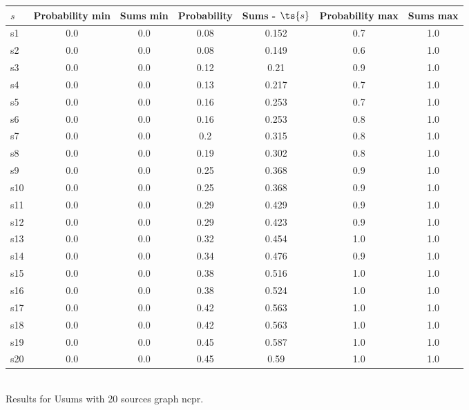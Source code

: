 \documentclass{article}
\begin{document}
\noindent\begin{tabular}{|l|c|c|c|c|c|c|}
\hline
$s$& Probability min & Sums min & Probability & Sums - $\ts{s}$ & Probability max & Sums max\\
\hline
s1 &0.0 & 0.0 & 0.08 & 0.152 & 0.7 & 1.0\\
\hline
s2 &0.0 & 0.0 & 0.08 & 0.149 & 0.6 & 1.0\\
\hline
s3 &0.0 & 0.0 & 0.12 & 0.21 & 0.9 & 1.0\\
\hline
s4 &0.0 & 0.0 & 0.13 & 0.217 & 0.7 & 1.0\\
\hline
s5 &0.0 & 0.0 & 0.16 & 0.253 & 0.7 & 1.0\\
\hline
s6 &0.0 & 0.0 & 0.16 & 0.253 & 0.8 & 1.0\\
\hline
s7 &0.0 & 0.0 & 0.2 & 0.315 & 0.8 & 1.0\\
\hline
s8 &0.0 & 0.0 & 0.19 & 0.302 & 0.8 & 1.0\\
\hline
s9 &0.0 & 0.0 & 0.25 & 0.368 & 0.9 & 1.0\\
\hline
s10 &0.0 & 0.0 & 0.25 & 0.368 & 0.9 & 1.0\\
\hline
s11 &0.0 & 0.0 & 0.29 & 0.429 & 0.9 & 1.0\\
\hline
s12 &0.0 & 0.0 & 0.29 & 0.423 & 0.9 & 1.0\\
\hline
s13 &0.0 & 0.0 & 0.32 & 0.454 & 1.0 & 1.0\\
\hline
s14 &0.0 & 0.0 & 0.34 & 0.476 & 0.9 & 1.0\\
\hline
s15 &0.0 & 0.0 & 0.38 & 0.516 & 1.0 & 1.0\\
\hline
s16 &0.0 & 0.0 & 0.38 & 0.524 & 1.0 & 1.0\\
\hline
s17 &0.0 & 0.0 & 0.42 & 0.563 & 1.0 & 1.0\\
\hline
s18 &0.0 & 0.0 & 0.42 & 0.563 & 1.0 & 1.0\\
\hline
s19 &0.0 & 0.0 & 0.45 & 0.587 & 1.0 & 1.0\\
\hline
s20 &0.0 & 0.0 & 0.45 & 0.59 & 1.0 & 1.0\\
\hline
\end{tabular}\\

\noindent Results for Usums with 20 sources graph ncpr.
\end{document}
